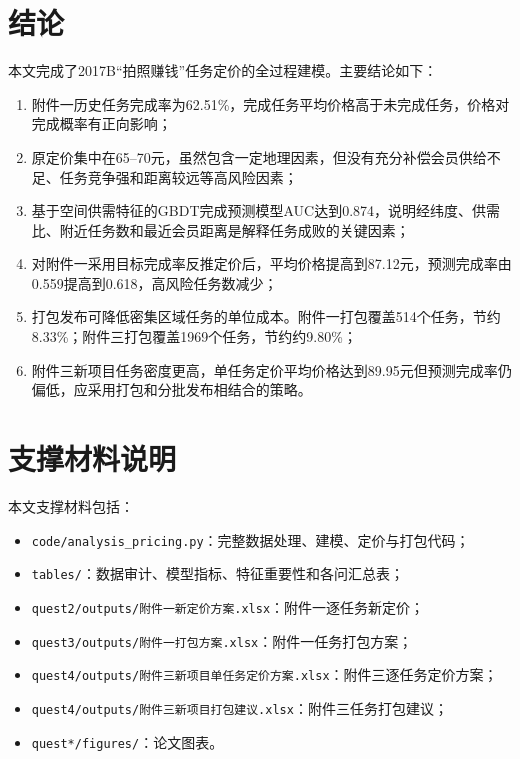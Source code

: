 \documentclass[UTF8,a4paper,12pt]{ctexart}
\begin{document}
\section{结论}
本文完成了2017B``拍照赚钱''任务定价的全过程建模。主要结论如下：
\begin{enumerate}[label=\arabic*)]
\item 附件一历史任务完成率为62.51\%，完成任务平均价格高于未完成任务，价格对完成概率有正向影响；
\item 原定价集中在65--70元，虽然包含一定地理因素，但没有充分补偿会员供给不足、任务竞争强和距离较远等高风险因素；
\item 基于空间供需特征的GBDT完成预测模型AUC达到0.874，说明经纬度、供需比、附近任务数和最近会员距离是解释任务成败的关键因素；
\item 对附件一采用目标完成率反推定价后，平均价格提高到87.12元，预测完成率由0.559提高到0.618，高风险任务数减少；
\item 打包发布可降低密集区域任务的单位成本。附件一打包覆盖514个任务，节约8.33\%；附件三打包覆盖1969个任务，节约约9.80\%；
\item 附件三新项目任务密度更高，单任务定价平均价格达到89.95元但预测完成率仍偏低，应采用打包和分批发布相结合的策略。
\end{enumerate}

\section*{支撑材料说明}
本文支撑材料包括：
\begin{itemize}
\item \texttt{code/analysis\_pricing.py}：完整数据处理、建模、定价与打包代码；
\item \texttt{tables/}：数据审计、模型指标、特征重要性和各问汇总表；
\item \texttt{quest2/outputs/附件一新定价方案.xlsx}：附件一逐任务新定价；
\item \texttt{quest3/outputs/附件一打包方案.xlsx}：附件一任务打包方案；
\item \texttt{quest4/outputs/附件三新项目单任务定价方案.xlsx}：附件三逐任务定价方案；
\item \texttt{quest4/outputs/附件三新项目打包建议.xlsx}：附件三任务打包建议；
\item \texttt{quest*/figures/}：论文图表。
\end{itemize}
\end{document}
